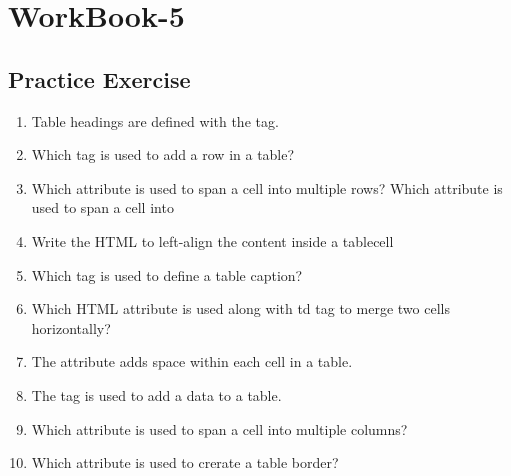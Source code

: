 \documentclass[11pt,a4paper]{article}
\begin{document}
\section*{WorkBook-5}
\subsection*{Practice Exercise}
\begin{enumerate}\itemsep10pt
\item Table headings are defined with the \underline{\hspace{3cm}} tag.
\item Which tag is used to add a row in a table? \underline{\hspace{3cm}}
\item Which attribute is used to span a cell into multiple rows? Which attribute is used to span a cell into 
\item Write the HTML to left-align the content inside a tablecell \underline{\hspace{3cm}}
\item Which tag is used to define a table caption? \underline{\hspace{3cm}}
\item Which HTML attribute is used along with td tag to merge two cells horizontally? \underline{\hspace{3cm}}
\item The \underline{\hspace{3cm}} attribute adds space within each cell in a table.
\item The \underline{\hspace{3cm}} tag is used to add a data to a table.
\item Which attribute is used to span a cell into multiple columns? \underline{\hspace{3cm}}
\item Which attribute is used to crerate a table border? \underline{\hspace{3cm}}
\end{enumerate}
\end{document}
